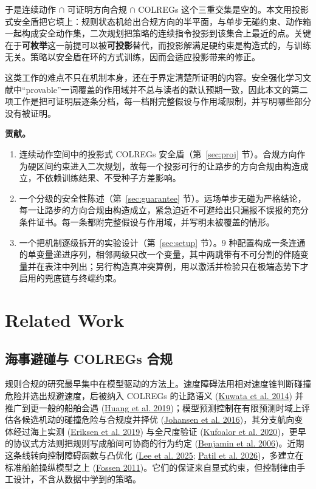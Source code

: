 \documentclass[12pt,letterpaper]{article}
\newcommand{\citl}[2]{(\hyperlink{ref:#1}{#2})}
\newcommand{\citm}[1]{(#1)}
\newcommand{\cl}[2]{\hyperlink{ref:#1}{#2}}
\begin{document}
于是连续动作 $\cap$ 可证明方向合规 $\cap$ COLREGs 这个三重交集是空的。本文用投影式安全盾把它填上：规则状态机给出合规方向的半平面，与单步无碰约束、动作箱一起构成安全动作集，二次规划把策略的连续指令投影到该集合上最近的点。关键在于\textbf{可枚举}这一前提可以被\textbf{可投影}替代，而投影解满足硬约束是构造式的，与训练无关。策略以安全盾在环的方式训练，因而会适应投影带来的修正。

这类工作的难点不只在机制本身，还在于界定清楚所证明的内容。安全强化学习文献中“provable”一词覆盖的作用域并不总与读者的默认预期一致，因此本文的第二项工作是把可证明层逐条分档，每一档附完整假设与作用域限制，并写明哪些部分没有被证明。

\noindent\textbf{贡献。}
\begin{enumerate}\itemsep2pt
 \item 连续动作空间中的投影式 COLREGs 安全盾（第~\ref{sec:proj} 节）。合规方向作为硬区间约束进入二次规划，故每一个投影可行的让路步的方向合规由构造成立，不依赖训练结果、不受种子方差影响。
 \item 一个分级的安全性陈述（第~\ref{sec:guarantee} 节）。远场单步无碰为严格结论，每一让路步的方向合规由构造成立，紧急迫近不可避给出只漏报不误报的充分条件证书。每一条都附完整假设与作用域，并写明未被覆盖的情形。
 \item 一个把机制逐级拆开的实验设计（第~\ref{sec:setup} 节）。$9$ 种配置构成一条连通的单变量递进序列，相邻两级只改一个变量，其中两跳带有不可分割的伴随变量并在表注中列出；另行构造真冲突算例，用以激活并检验只在极端态势下才启用的兜底链与终端约束。
\end{enumerate}

\section{Related Work}

\subsection{海事避碰与 COLREGs 合规}

规则合规的研究最早集中在模型驱动的方法上。速度障碍法用相对速度锥判断碰撞危险并选出规避速度，后被纳入 COLREGs 的让路语义 \citl{kuwata2014}{Kuwata et al. 2014} 并推广到更一般的船舶会遇 \citl{huang2019}{Huang et al. 2019}；模型预测控制在有限预测时域上评估各候选机动的碰撞危险与合规度并择优 \citl{johansen2016}{Johansen et al. 2016}，其分支航向变体经过海上实测 \citl{eriksen2019}{Eriksen et al. 2019} 与全尺度验证 \citl{kufoalor2020}{Kufoalor et al. 2020}，更早的协议式方法则把规则写成船间可协商的行为约定 \citl{benjamin2006}{Benjamin et al. 2006}。近期这条线转向控制障碍函数与凸优化 \citm{\cl{lee2025}{Lee et al. 2025}; \cl{patil2026}{Patil et al. 2026}}，多建立在标准船舶操纵模型之上 \citl{fossen2011}{Fossen 2011}。它们的保证来自显式约束，但控制律由手工设计，不含从数据中学到的策略。
\end{document}
